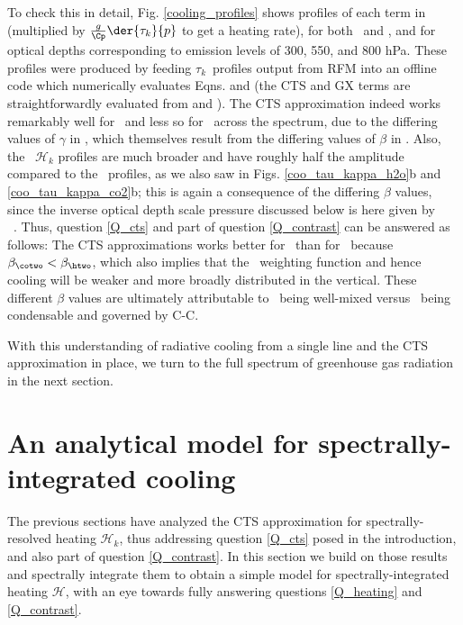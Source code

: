 \documentclass[10pt]{article}
\newcommand{\ch}{\ensuremath{\mathcal{H}}}
\newcommand{\tauk}{\ensuremath{\tau_k}}
\begin{document}
To check this in detail, Fig. \ref{cooling_profiles} shows profiles of each term in  (multiplied by $\frac{g}{\Cp}\der{\tauk}{p}$ to get a heating rate), for both \htwo\ and \cotwo, and for optical depths corresponding to emission levels of 300, 550, and  800 hPa. These profiles were produced by feeding \tauk\ profiles output from RFM into an offline code which numerically evaluates  Eqns.  and  (the CTS and GX terms are straightforwardly evaluated from  and ). The CTS approximation indeed works remarkably well for \htwo\, and less so for \cotwo\ across the spectrum, due to the differing values of $\gamma$ in , which themselves result from the differing values of $\beta$ in . Also, the \cotwo\ $\ch_k$  profiles are much broader and have roughly half the amplitude compared to the \htwo\ profiles, as we also saw in Figs. \ref{coo_tau_kappa_h2o}b and \ref{coo_tau_kappa_co2}b; this is again a consequence of the differing $\beta$ values, since the inverse optical depth scale pressure discussed below  is here given by
\beqn
	\der{\ln \tauk}{p} \  \approx \  \ .
	\label{scale_beta}
\eeqn
Thus, question \ref{Q_cts} and part of question \ref{Q_contrast} can be answered as follows: The CTS approximations works better for  \htwo\ than for  \cotwo\ because $\beta_{\cotwo} < \beta_{\htwo}$, which also implies that the \cotwo\ weighting function and hence cooling will be weaker and more broadly distributed in the vertical. These different $\beta$ values are ultimately attributable to \cotwo\ being well-mixed versus \htwo\ being condensable and governed by C-C. 

With this understanding of radiative cooling from a single line and the CTS approximation in place, we turn to the full spectrum of greenhouse gas radiation in the next section.


\section{An analytical model for spectrally-integrated cooling} \label{sec_cts_theory}
 The previous sections have analyzed the CTS approximation for spectrally-resolved heating $\ch_k$, thus addressing question \ref{Q_cts} posed in the introduction, and also part of question \ref{Q_contrast}. In this section we build on those results and spectrally integrate them to obtain a simple model for spectrally-integrated heating $\ch$, with an eye towards fully answering questions \ref{Q_heating} and \ref{Q_contrast}.
 
\end{document}
